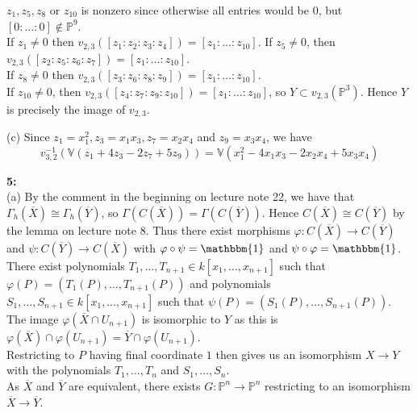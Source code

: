 \documentclass[a4paper]{article}
\begin{document}
    $z_1, z_5, z_8$ or $z_{10}$ is nonzero since
    otherwise all entries would be  $0$, but $
    \left[ 0 : \ldots : 0 \right] \not\in  \mathbb{P}^{9}$.\\
    If $z_1 \neq 0$ then
    $v_{2,3} \left( \left[ z_1 : z_2 : z_3 : z_4 \right]  \right) 
    = \left[ z_1 : \ldots : z_{10} \right] $. If
    $z_5 \neq 0$, then
    $v_{2,3}\left( \left[ z_2 : z_5 : z_6 : z_7 \right]  \right) 
    = \left[ z_1 : \ldots : z_{10} \right] $.\\
    If $z_8 \neq 0$ then
    $v_{2,3} \left( \left[ z_3 : z_6 : z_8 : z_9 \right]  \right) 
    = \left[ z_1 :\ldots : z_{10} \right] $.\\
    If $z_{10} \neq 0$, then
    $v_{2,3} \left( \left[ z_4 : z_7 : z_9 : z_{10} \right]  \right) 
    = \left[ z_1 : \ldots : z_{10} \right] $, so
    $Y \subset v_{2,3} \left( \mathbb{P}^3 \right) $. Hence
    $Y$ is precisely the image of $v_{2,3}$.
     

     \newpage
     (c) Since $z_1 = x_1^2,
     z_3 = x_1 x_3, z_7 = x_2 x_4$ and
     $z_9 = x_3 x_4$, we have
     \[
     v_{3,2}^{-1}\left( 
     \mathbb{V} \left( z_1 + 4z_3 - 2z_7+ 5 z_9 \right) \right) 
     = \mathbb{V}
     \left( x_1^2 - 4x_1 x_3 - 2
     x_2 x_4 + 5 x_3 x_4\right) 
     \] 

     \textbf{5:}\\
     (a) 
     \linebreak
     By the comment in the beginning on lecture note 22, 
     we have that
     $\Gamma_h (\overline{X}) \cong
     \Gamma_h (\overline{Y})$, so
     $\Gamma(C(\overline{X})) =
     \Gamma \left( C(\overline{Y}) \right) $. Hence
     $C(\overline{X}) \cong C(\overline{Y})$ by the lemma on lecture note 8. Thus there
     exist morphisms $\varphi  \colon C(\overline{X}) \to C(\overline{Y})$ and
     $\psi  \colon C\left( \overline{Y} \right) \to 
     C\left( \overline{X} \right) $ with
     $\varphi \circ \psi = \mathbbm{1}$ and
     $\psi \circ \varphi = \mathbbm{1}$.\\
     There exist polynomials $T_1, \ldots, T_{n+1} \in k\left[ x_1, \ldots,
     x_{n+1} \right] $ 
     such that
     $\varphi (P ) = \left( T_1(P),\ldots, T_{n+1}(P) \right) $ 
     and polynomials 
     $S_1, \ldots, S_{n+1} \in k\left[ x_1, \ldots, x_{n+1} \right] $ such that
     $\psi(P) = \left( S_1 (P), \ldots, S_{n+1}(P) \right) $.
     The image
     $\varphi \left( \overline{X}\cap U_{n+1} \right) $ is isomorphic to
     $Y$ as this is
     $\varphi(\overline{X}) \cap \varphi (U_{n+1}) = \overline{Y} 
     \cap \varphi(U_{n+1}) $.\\
     Restricting to $P$ having final coordinate $1$ then gives us an
     isomorphism
     $X \to Y$ with the polynomials $T_1, \ldots, T_{n}$ and
     $S_1, \ldots, S_n$.\\
     As $\overline{X}$ and $\overline{Y}$ are equivalent, there exists
     $G  \colon \mathbb{P}^{n} \to \mathbb{P}^{n}$ restricting to an
     isomorphism $\overline{X} \to \overline{Y}$. 
     
\end{document}
